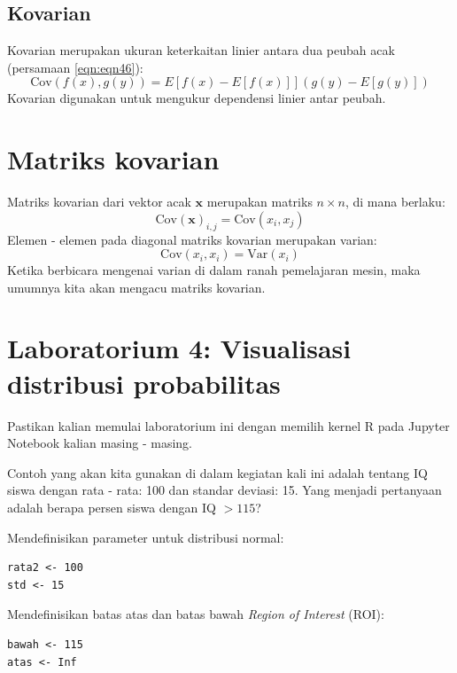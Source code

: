 \subsection{Kovarian}
Kovarian merupakan ukuran keterkaitan linier antara dua peubah acak (persamaan \ref{eqn:eqn46}):
\begin{equation}
    \text{Cov}(f(x), g(y)) = E\left[f(x) -E[f(x)]\right](g(y) - E[g(y)])
    \label{eqn:eqn46}
\end{equation}
Kovarian digunakan untuk mengukur dependensi linier antar peubah.
\section{Matriks kovarian}
Matriks kovarian dari vektor acak $\mathbf{x}$ merupakan matriks $n \times n$, di mana berlaku:
\begin{equation}
    \text{Cov}(\mathbf{x})_{i,j} = \text{Cov}(x_{i}, x_{j})
    \label{eqn:eqn47}
\end{equation}
Elemen - elemen pada diagonal matriks kovarian merupakan varian:
\begin{equation}
    \text{Cov}(x_{i}, x_{i}) = \text{Var}(x_{i})
    \label{eqn:eqn48}
\end{equation}
Ketika berbicara mengenai varian di dalam ranah pemelajaran mesin, maka umumnya kita akan mengacu matriks kovarian.

\section{Laboratorium 4: Visualisasi distribusi probabilitas}
Pastikan kalian memulai laboratorium ini dengan memilih kernel R pada Jupyter Notebook kalian masing - masing.

Contoh yang akan kita gunakan di dalam kegiatan kali ini adalah tentang IQ siswa dengan rata - rata: 100 dan standar deviasi: 15. Yang menjadi pertanyaan adalah berapa persen siswa dengan IQ $> 115$?

Mendefinisikan parameter untuk distribusi normal:

\begin{verbatim}
rata2 <- 100
std <- 15
\end{verbatim}

Mendefinisikan batas atas dan batas bawah \textit{Region of Interest} (ROI):

\begin{verbatim}
bawah <- 115
atas <- Inf
\end{verbatim}

